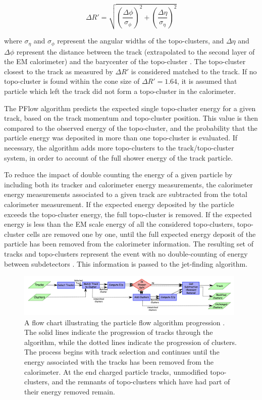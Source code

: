 \begin{equation}
	\Delta R' = \sqrt{\left(\frac{\Delta\phi}{\sigma_\phi}\right)^2 + \left(\frac{\Delta\eta}{\sigma_\eta}\right)^2}
\end{equation}

where $\sigma_\eta$ and $\sigma_\phi$ represent the angular widths of the topo-clusters, and $\Delta\eta$ and $\Delta\phi$ represent the distance between the track (extrapolated to the second layer of the EM calorimeter) and the barycenter of the topo-cluster \cite{pflow}. The topo-cluster closest to the track as measured by $\Delta R'$ is considered matched to the track. If no topo-cluster is found within the cone size of $\Delta R' = 1.64$, it is assumed that particle which left the track did not form a topo-cluster in the calorimeter. \par 

The PFlow algorithm predicts the expected single topo-cluster energy for a given track, based on the track momentum and topo-cluster position. This value is then compared to the observed energy of the topo-cluster, and the probability that the particle energy was deposited in more than one topo-cluster is evaluated. If necessary, the algorithm adds more topo-clusters to the track/topo-cluster system, in order to account of the full shower energy of the track particle. \par

To reduce the impact of double counting the energy of a given particle by including both its tracker and calorimeter energy measurements, the calorimeter energy measurements associated to a given track are subtracted from the total calorimeter measurement. If the expected energy deposited by the particle exceeds the topo-cluster energy, the full topo-cluster is removed. If the expected energy is less than the EM scale energy of all the considered topo-clusters, topo-cluster cells are removed one by one, until the full expected energy deposit of the particle has been removed from the calorimeter information. The resulting set of tracks and topo-clusters represent the event with no double-counting of energy between subdetectors \cite{pflow}. This information is passed to the jet-finding algorithm.

\begin{figure}[h]
        \centering
	\includegraphics[width=0.98\textwidth]{figures/ch5/pflow_diagram}
	\caption{ A flow chart illustrating the particle flow algorithm progression \cite{pflow}. The solid lines indicate the progression of tracks through the algorithm, while the dotted lines indicate the progression of clusters. The process begins with track selection and continues until the energy associated with the tracks has been removed from the calorimeter. At the end charged particle tracks, unmodified topo-clusters, and the remnants of topo-clusters which have had part of their energy removed remain. }
	\label{fig:pflow_diagram}
\end{figure}

